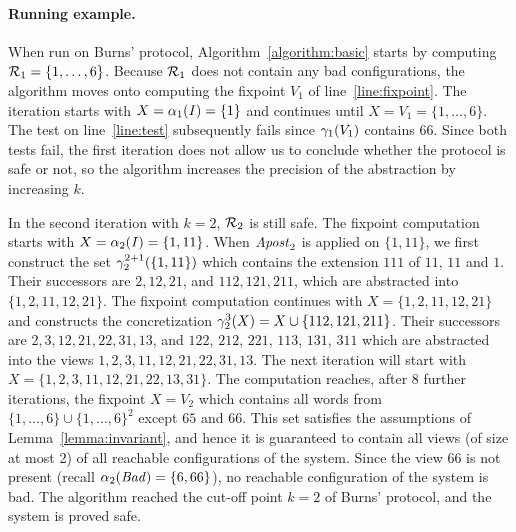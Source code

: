 \paragraph{Running example.}
When run on Burns' protocol, Algorithm~\ref{algorithm:basic} starts by
computing $\mathcal{R}_{1} = \{1,\ldots,6\}$.  Because $\mathcal{R}_{1}$ does
not contain any bad configurations, the algorithm moves onto computing
the fixpoint $V_1$ of line~\ref{line:fixpoint}. The iteration starts
with $X = \alpha_1(\mathit{I}) = \{1\}$ and continues until $X = V_1 =
\{1,\ldots,6\}$.  The test on line~\ref{line:test} subsequently fails
since $\gamma_{1}(V_1)$ contains $66$.  Since both tests fail, the first
iteration does not allow us to conclude whether the protocol is safe
or not, so the algorithm increases the precision of the abstraction by
increasing $k$.

In the second iteration with $k=2$, $\mathcal{R}_{2}$ is still safe.  The
fixpoint computation starts with $X = \alpha_2(\mathit{I}) = \{1,11\}$.
When ${\mathit{Apost}}_2$ is applied on $\{1,11\}$, we first construct the set 
$\gamma_{2}^{2+1}(\{1,11\})$ which contains the extension $111$ of $11$, $11$ and $1$.
Their successors are $2,12,21$, and $112,121,211$, which are abstracted into
$\{1,2,11,12,21\}$.
%
The fixpoint computation continues with $X = \{1,2,11,12,21\}$ and
constructs the concretization $\gamma_{2}^{3} (X) = X\cup \{112,121,211\}$. Their successors are $2,3,12,21,22,31,13$, and $122$,
$212$, $221$, $113$, $131$, $311$
%
which are abstracted into the views $1,2,3,11,12,21,22,31,13$.  
%
The next iteration will start with $X = \{1,2,3,11,12, 21,22, 13,31\}$.
%
The computation reaches, after 8 further iterations, the fixpoint
$X=V_2$ which contains all words from $\{1,\ldots,6\}\cup\{1,\ldots,6\}^2$ except $65$
and $66$.
%
This set satisfies the assumptions of Lemma~\ref{lemma:invariant}, and
hence it is guaranteed to contain all views (of size at most 2) of all
reachable configurations of the system.
%
Since the view $66$ is not present (recall $\alpha_2(\mathit{Bad})=\{6,66\}$),
no reachable configuration of the system is bad. The algorithm reached
the cut-off point $k=2$ of Burns' protocol, and the system is proved
safe.




